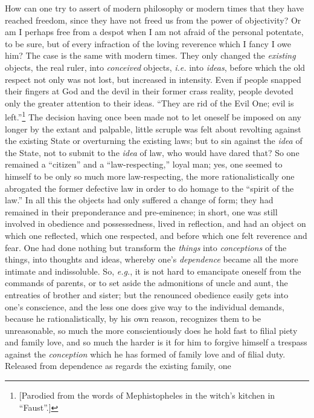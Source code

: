 \documentclass[12pt,a4paper]{book}
\begin{document}
How can one try to assert of modern philosophy or modern times that they have 
reached freedom, since they have not freed us from the power of objectivity? 
Or am I perhaps free from a despot when I am not afraid of the personal 
potentate, to be sure, but of every infraction of the loving reverence which I 
fancy I owe him? The case is the same with modern times. They only changed the 
\textit{existing} objects, the real ruler, into \textit{conceived} objects, 
\textit{i.e.} into \textit{ideas}, before which the old respect not only was 
not lost, but increased in intensity. Even if people snapped their fingers at 
God and the devil in their former crass reality, people devoted only the 
greater attention to their ideas. ``They are rid of the Evil One; evil is 
left.''\footnote{[Parodied from the words of Mephistopheles in the witch's 
kitchen in ``Faust''.]} The decision having once been made not to let 
oneself be imposed on any longer by the extant and palpable, little scruple 
was felt about revolting against the existing State or overturning the 
existing laws; but to sin against the \textit{idea} of the State, not to 
submit to the \textit{idea} of law, who would have dared that? So one remained 
a ``citizen'' and a ``law-respecting,'' loyal man; yes, one seemed to 
himself to be only so much more law-respecting, the more rationalistically one 
abrogated the former defective law in order to do homage to the ``spirit of 
the law.'' In all this the objects had only suffered a change of form; they 
had remained in their preponderance and pre-eminence; in short, one was still 
involved in obedience and possessedness, lived in reflection, and had an 
object on which one reflected, which one respected, and before which one felt 
reverence and fear. One had done nothing but transform the \textit{things} 
into \textit{conceptions} of the things, into thoughts and ideas, whereby 
one's \textit{dependence} became all the more intimate and indissoluble. So, 
\textit{e.g.}, it is not hard to emancipate oneself from the commands of 
parents, or to set aside the admonitions of uncle and aunt, the entreaties of 
brother and sister; but the renounced obedience easily gets into one's 
conscience, and the less one does give way to the individual demands, because 
he rationalistically, by his own reason, recognizes them to be unreasonable, 
so much the more conscientiously does he hold fast to filial piety and family 
love, and so much the harder is it for him to forgive himself a trespass 
against the \textit{conception} which he has formed of family love and of 
filial duty. Released from dependence as regards the existing family, one 
\end{document}
